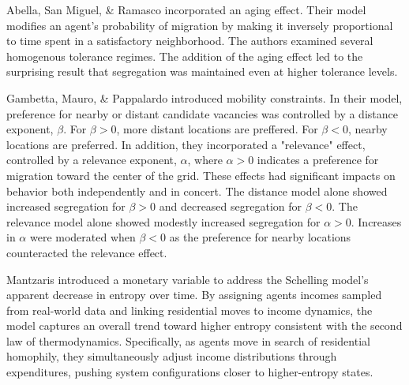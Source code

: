 \documentclass[a4paper]{article}
\begin{document}
Abella, San Miguel, \& Ramasco \cite{AbellaDavid2022AeiS} incorporated an aging effect. Their model modifies an agent's probability of migration by making it inversely proportional to time spent in a satisfactory neighborhood. The authors examined several homogenous tolerance regimes. The addition of the aging effect led to the surprising result that segregation was maintained even at higher tolerance levels.

Gambetta, Mauro, \& Pappalardo \cite{GambettaDaniele2023Mcis} introduced mobility constraints. In their model, preference for nearby or distant candidate vacancies was controlled by a distance exponent, $\beta$. For $\beta > 0$, more distant locations are preffered. For $\beta < 0$, nearby locations are preferred. In addition, they incorporated a "relevance" effect, controlled by a relevance exponent, $\alpha$, where $\alpha > 0$ indicates a preference for migration toward the center of the grid. These effects had significant impacts on behavior both independently and in concert. The distance model alone showed increased segregation for $\beta > 0$ and decreased segregation for $\beta < 0$. The relevance model alone showed modestly increased segregation for $\alpha > 0$. Increases in $\alpha$ were moderated when $\beta < 0$ as the preference for nearby locations counteracted the relevance effect.

Mantzaris \cite{MantzarisAlexanderV.2020Iamv} introduced a monetary variable  to address the Schelling model’s apparent decrease in entropy over time. By assigning agents incomes sampled from real-world data and linking residential moves to income dynamics, the model captures an overall trend toward higher entropy consistent with the second law of thermodynamics. Specifically, as agents move in search of residential homophily, they simultaneously adjust income distributions through expenditures, pushing system configurations closer to higher-entropy states.
\end{document}
